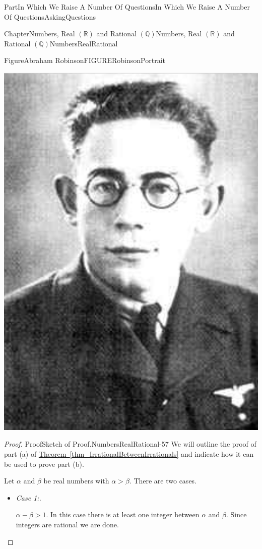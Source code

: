 \documentclass[oneside,10pt,]{book}
\newcommand{\xreffont}{\relax}
\newcommand{\lititle}[1]{{\slshape#1}}
\numberwithin{equation}{part}
\newcommand{\RR}{\mathbb {R}}
\newcommand{\QQ}{\mathbb {Q}}
\begin{document}
\begin{partptx}{Part}{In Which We Raise A Number Of Questions}{}{In Which We Raise A Number Of Questions}{}{}{AskingQuestions}
\begin{chapterptx}{Chapter}{Numbers, Real \(\left(\RR\right)\) and Rational \(\left(\QQ\right)\)}{}{Numbers, Real \(\left(\RR\right)\) and Rational \(\left(\QQ\right)\)}{}{}{NumbersRealRational}
\begin{figureptx}{Figure}{Abraham Robinson}{FIGURERobinsonPortrait}{}
\begin{image}{0.325}{0.35}{0.325}{}
\includegraphics[width=\linewidth]{external/images/Robinson.png}
\end{image}%
\tcblower
\end{figureptx}%
\begin{proof}{Proof}{Sketch of Proof.}{NumbersRealRational-57}
We will outline the proof of part (a) of \hyperref[thm_IrrationalBetweenIrrationals]{Theorem~{\xreffont\ref{thm_IrrationalBetweenIrrationals}}} and indicate how it can be used to prove part (b).%
\par
Let \(\alpha\) and \(\beta\) be real numbers with \(\alpha > \beta\). There are two cases.%
\begin{itemize}[label=\textbullet]
\item{}\lititle{Case 1:.}\par%
\(\alpha-\beta > 1\). In this case there is at least one integer between \(\alpha\) and \(\beta\). Since integers are rational we are done.%

\end{itemize}
\end{proof}
\end{chapterptx}
\end{partptx}
\end{document}
